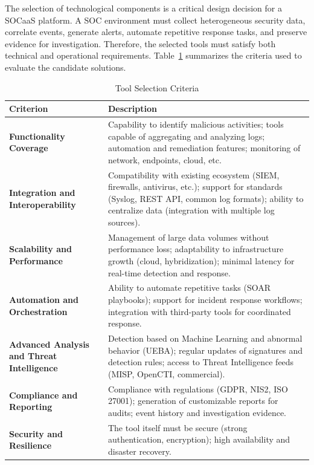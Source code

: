 The selection of technological components is a critical design decision for a SOCaaS platform. A SOC environment must collect heterogeneous security data, correlate events, generate alerts, automate repetitive response tasks, and preserve evidence for investigation. Therefore, the selected tools must satisfy both technical and operational requirements. Table~\ref{tab:criteria} summarizes the criteria used to evaluate the candidate solutions.

\begin{table}[H]
\centering
\caption{Tool Selection Criteria}
\label{tab:criteria}
\renewcommand{\arraystretch}{1.4}
\begin{tabular}{>{\raggedright\arraybackslash}p{3cm} p{10.5cm}}
\toprule
\rowcolor{tableheader}
\textbf{Criterion} & \textbf{Description} \\
\midrule
\textbf{Functionality Coverage} & Capability to identify malicious activities; tools capable of aggregating and analyzing logs; automation and remediation features; monitoring of network, endpoints, cloud, etc. \\
\midrule
\textbf{Integration and Interoperability} & Compatibility with existing ecosystem (SIEM, firewalls, antivirus, etc.); support for standards (Syslog, REST API, common log formats); ability to centralize data (integration with multiple log sources). \\
\midrule
\textbf{Scalability and Performance} & Management of large data volumes without performance loss; adaptability to infrastructure growth (cloud, hybridization); minimal latency for real-time detection and response. \\
\midrule
\textbf{Automation and Orchestration} & Ability to automate repetitive tasks (SOAR playbooks); support for incident response workflows; integration with third-party tools for coordinated response. \\
\midrule
\textbf{Advanced Analysis and Threat Intelligence} & Detection based on Machine Learning and abnormal behavior (UEBA); regular updates of signatures and detection rules; access to Threat Intelligence feeds (MISP, OpenCTI, commercial). \\
\midrule
\textbf{Compliance and Reporting} & Compliance with regulations (GDPR, NIS2, ISO 27001); generation of customizable reports for audits; event history and investigation evidence. \\
\midrule
\textbf{Security and Resilience} & The tool itself must be secure (strong authentication, encryption); high availability and disaster recovery. \\

\end{tabular}
\end{table}
